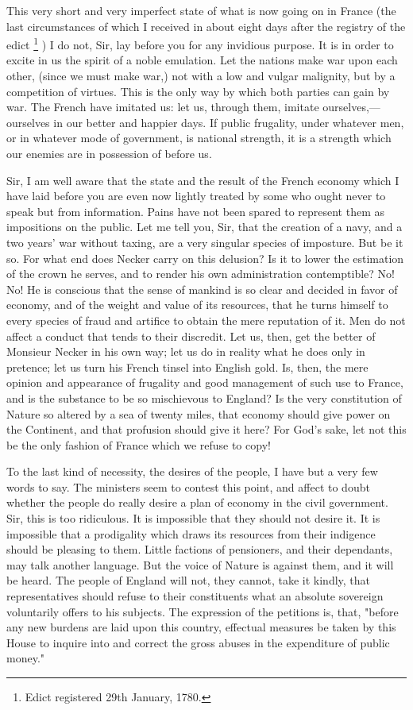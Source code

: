 This very short and very imperfect state of what is now going on in France (the last circumstances of which I received in about eight days after the registry of the edict
\footnote{Edict registered 29th January, 1780.}
) I do not, Sir, lay before you for any invidious purpose. It is in order to excite in us the spirit of a noble emulation. Let the nations make war upon each other, (since we must make war,) not with a low and vulgar malignity, but by a competition of virtues. This is the only way by which both parties can gain by war. The French have imitated us: let us, through them, imitate ourselves,—ourselves in our better and happier days. If public frugality, under whatever men, or in whatever mode of government, is national strength, it is a strength which our enemies are in possession of before us.

Sir, I am well aware that the state and the result of the French economy which I have laid before you are even now lightly treated by some who ought never to speak but from information. Pains have not been spared to represent them as impositions on the public. Let me tell you, Sir, that the creation of a navy, and a two years' war without taxing, are a very singular species of imposture. But be it so. For what end does Necker carry on this delusion? Is it to lower the estimation of the crown he serves, and to render his own administration contemptible? No! No! He is conscious that the sense of mankind is so clear and decided in favor of economy, and of the weight and value of its resources, that he turns himself to every species of fraud and artifice to obtain the mere reputation of it. Men do not affect a conduct that tends to their discredit. Let us, then, get the better of Monsieur Necker in his own way; let us do in reality what he does only in pretence; let us turn his French tinsel into English gold. Is, then, the mere opinion and appearance of frugality and good management of such use to France, and is the substance to be so mischievous to England? Is the very constitution of Nature so altered by a sea of twenty miles, that economy should give power on the Continent, and that profusion should give it here? For God's sake, let not this be the only fashion of France which we refuse to copy!

To the last kind of necessity, the desires of the people, I have but a very few words to say. The ministers seem to contest this point, and affect to doubt whether the people do really desire a plan of economy in the civil government. Sir, this is too ridiculous. It is impossible that they should not desire it. It is impossible that a prodigality which draws its resources from their indigence should be pleasing to them. Little factions of pensioners, and their dependants, may talk another language. But the voice of Nature is against them, and it will be heard. The people of England will not, they cannot, take it kindly, that representatives should refuse to their constituents what an absolute sovereign voluntarily offers to his subjects. The expression of the petitions is, that, "before any new burdens are laid upon this country, effectual measures be taken by this House to inquire into and correct the gross abuses in the expenditure of public money."

